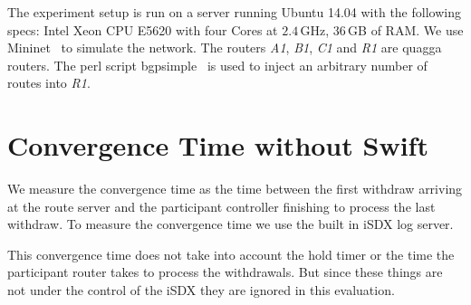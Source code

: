 The experiment setup is run on a server running Ubuntu 14.04 with the following specs: Intel Xeon CPU E5620 with four Cores at $2.4$\,GHz, $36$\,GB of RAM. We use Mininet~\cite{mininet} to simulate the network. The routers \emph{A1}, \emph{B1}, \emph{C1} and \emph{R1} are quagga~\cite{quagga} routers. The perl script bgpsimple~\cite{bgpsimple} is used to inject an arbitrary number of routes into \emph{R1}. 

\section{\label{chapter5:Convergence time without Swift}Convergence Time without Swift}

We measure the convergence time as the time between the first withdraw arriving at the route server and the participant controller finishing to process the last withdraw. To measure the convergence time we use the built in iSDX log server.

This convergence time does not take into account the hold timer or the time the participant router takes to process the withdrawals. But since these things are not under the control of the iSDX they are ignored in this evaluation.

